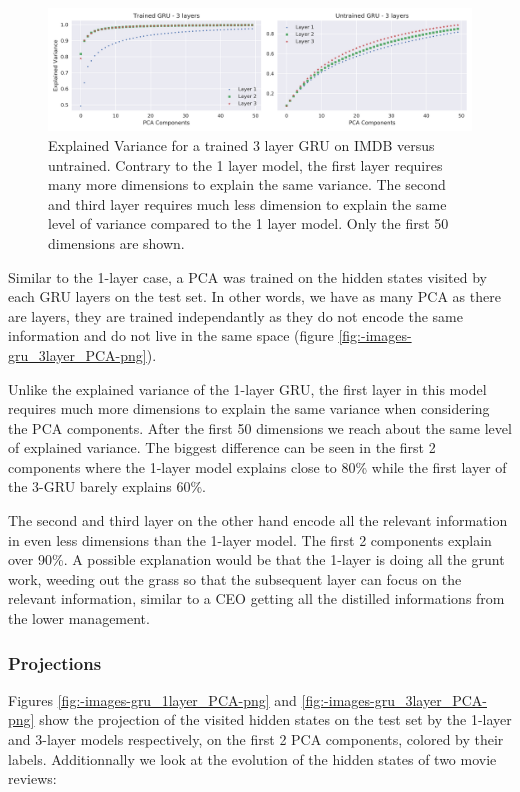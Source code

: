 \documentclass{article}
\begin{document}
\begin{figure}[H]
  \centering
  \includegraphics[width=1\textwidth]{../images/gru_3layer_explained_variance.png}
  \caption{Explained Variance for a trained 3 layer GRU on IMDB versus untrained. 
    Contrary to the 1 layer model, the first layer requires many more dimensions 
    to explain the same variance. The second and third layer requires much less dimension 
    to explain the same level of variance compared to the 1 layer model. Only the first 50 dimensions are shown.
  }
  \label{fig:-images-gru_3layer_explained_variance-png}
\end{figure}
Similar to the 1-layer case, a PCA was trained on the hidden states visited by each GRU layers on the test set. In other words, we have as many PCA as there are layers, they are trained independantly as they do not encode the same information and do not live in the same space (figure \ref{fig:-images-gru_3layer_PCA-png}).

Unlike the explained variance of the 1-layer GRU, the first layer in this model requires much more dimensions to explain the same variance when considering the PCA components. After the first 50 dimensions we reach about the same level of explained variance. The biggest difference can be seen in the first 2 components where the 1-layer model explains close to 80\% while the first layer of the 3-GRU barely explains 60\%. 

The second and third layer on the other hand encode all the relevant information in even less dimensions than the 1-layer model. The first 2 components explain over 90\%. A possible explanation would be that the 1-layer is doing all the grunt work, weeding out the grass so that the subsequent layer can focus on the relevant information, similar to a CEO getting all the distilled informations from the lower management. 
\subsubsection{Projections}

Figures \ref{fig:-images-gru_1layer_PCA-png} and \ref{fig:-images-gru_3layer_PCA-png} show the projection of the visited hidden states on the test set by the 1-layer and 3-layer models respectively, on the first 2 PCA components, colored by their labels. Additionnally we look at the evolution of the hidden states of two movie reviews: 
\end{document}
